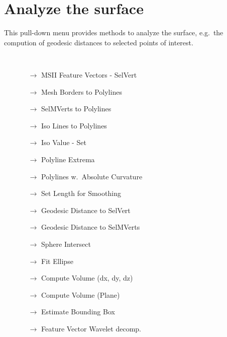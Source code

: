 \section{Analyze the surface}\label{analyze} 
This pull-down menu provides methods to analyze the surface, e.g.~the compution of geodesic distances to selected points of interest.
{\tt
\begin{itemize}
\item[] 
  \begin{itemize}
  \item[$\rightarrow$] MSII Feature Vectors - SelVert
  \item[$\rightarrow$] Mesh Borders to Polylines
  \item[$\rightarrow$] SelMVerts to Polylines
  \item[$\rightarrow$] Iso Lines to Polylines
  \item[$\rightarrow$] Iso Value - Set
  \color{gray}
  \item[$\rightarrow$] Polyline Extrema
  \item[$\rightarrow$] Polylines w.~Absolute Curvature
  \color{black}
  \item[$\rightarrow$] Set Length for Smoothing
  \item[$\rightarrow$] Geodesic Distance to SelVert
  \item[$\rightarrow$] Geodesic Distance to SelMVerts
  \item[$\rightarrow$] Sphere Intersect
  \item[$\rightarrow$] Fit Ellipse
  \item[$\rightarrow$] Compute Volume (dx, dy, dz)
  \item[$\rightarrow$] Compute Volume (Plane)
  \item[$\rightarrow$] Estimate Bounding Box
  \item[$\rightarrow$] Feature Vector Wavelet decomp.
  \end{itemize}
 \end{itemize}
 }


